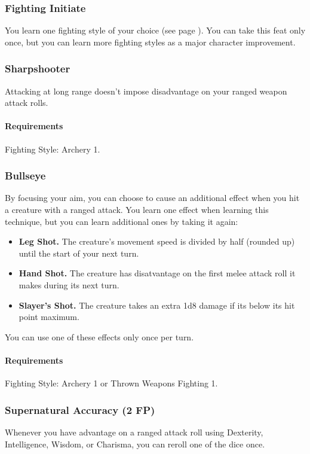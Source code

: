 \subsubsection{Fighting Initiate} \label{feat::fightinginitiate}
    You learn one fighting style of your choice (see page \pageref{ssec::fightingstyles}).
    You can take this feat only once, but you can learn more fighting styles as a major character improvement.
\subsubsection{Sharpshooter} \label{feat::sharpshooter}
    Attacking at long range doesn't impose disadvantage on your ranged weapon attack rolls.
    \paragraph{Requirements} Fighting Style: Archery 1.
\subsubsection{Bullseye} \label{feat::bullseye}
    By focusing your aim, you can choose to cause an additional effect when you hit a creature with a ranged attack.
    You learn one effect when learning this technique, but you can learn additional ones by taking it again:
    \begin{itemize}
        \item \textbf{Leg Shot.} The creature's movement speed is divided by half (rounded up) until the start of your next turn.
        \item \textbf{Hand Shot.} The creature has disatvantage on the first melee attack roll it makes during its next turn.
        \item \textbf{Slayer's Shot.} The creature takes an extra 1d8 damage if its below its hit point maximum.
    \end{itemize}

    You can use one of these effects only once per turn.
    \paragraph{Requirements} Fighting Style: Archery 1 or Thrown Weapons Fighting 1.
\subsubsection{Supernatural Accuracy (2 FP)} \label{feat::supernaturalaccuracy}
    Whenever you have advantage on a ranged attack roll using Dexterity, Intelligence, Wisdom, or Charisma, you can reroll one of the dice once.
